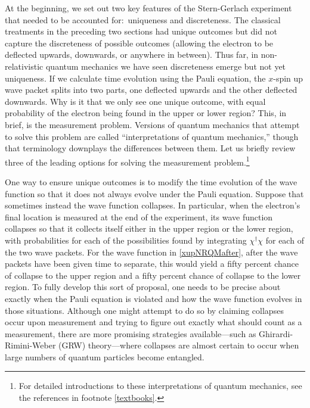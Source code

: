 \documentclass[12pt,secnumarabic,amsmath,amssymb,balancelastpage,nofootinbib]{article}
\begin{document}
At the beginning, we set out two key features of the Stern-Gerlach experiment that needed to be accounted for:\ uniqueness and discreteness.  The classical treatments in the preceding two sections had unique outcomes but did not capture the discreteness of possible outcomes (allowing the electron to be deflected upwards, downwards, or anywhere in between).  Thus far, in non-relativistic quantum mechanics we have seen discreteness emerge but not yet uniqueness.  If we calculate time evolution using the Pauli equation, the $x$-spin up wave packet splits into two parts, one deflected upwards and the other deflected downwards.  Why is it that we only see one unique outcome, with equal probability of the electron being found in the upper or lower region?  This, in brief, is the measurement problem.  Versions of quantum mechanics that attempt to solve this problem are called ``interpretations of quantum mechanics,'' though that terminology downplays the differences between them.  Let us briefly review three of the leading options for solving the measurement problem.\footnote{For detailed introductions to these interpretations of quantum mechanics, see the references in footnote \ref{textbooks}.}

One way to ensure unique outcomes is to modify the time evolution of the wave function so that it does not always evolve under the Pauli equation.  Suppose that sometimes instead the wave function collapses.  In particular, when the electron's final location is measured at the end of the experiment, its wave function collapses so that it collects itself either in the upper region or the lower region, with probabilities for each of the possibilities found by integrating $\chi^{\dagger}\chi$ for each of the two wave packets.  For the wave function in \eqref{xupNRQMafter}, after the wave packets have been given time to separate, this would yield a fifty percent chance of collapse to the upper region and a fifty percent chance of collapse to the lower region.  To fully develop this sort of proposal, one needs to be precise about exactly when the Pauli equation is violated and how the wave function evolves in those situations.  Although one might attempt to do so by claiming collapses occur upon measurement and trying to figure out exactly what should count as a measurement, there are more promising strategies available---such as Ghirardi-Rimini-Weber (GRW) theory---where collapses are almost certain to occur when large numbers of quantum particles become entangled.
\end{document}

